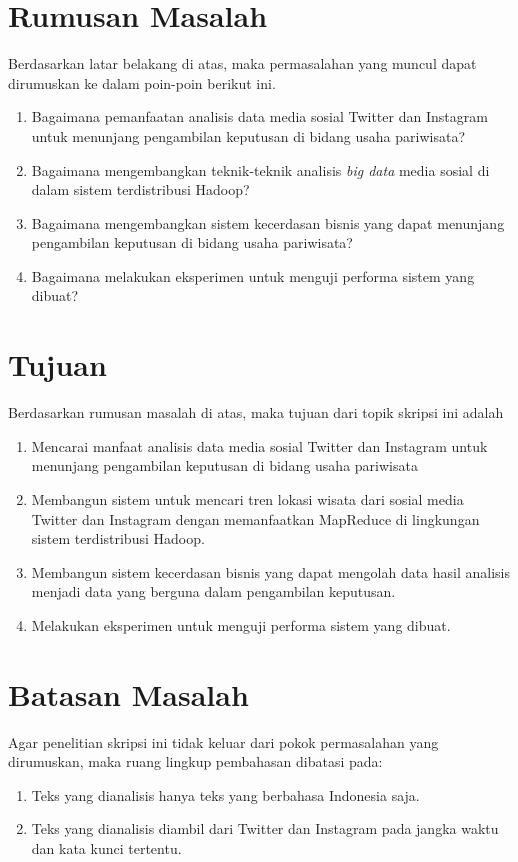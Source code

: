 \section{Rumusan Masalah}
\label{sec:rumusan_masalah}
Berdasarkan latar belakang di atas, maka permasalahan yang muncul dapat dirumuskan ke dalam poin-poin berikut ini.
\begin{enumerate}
	\item Bagaimana pemanfaatan analisis data media sosial Twitter dan Instagram untuk menunjang pengambilan keputusan di bidang usaha pariwisata?
	\item Bagaimana mengembangkan teknik-teknik analisis \textit{big data} media sosial di dalam sistem terdistribusi Hadoop?
	\item Bagaimana mengembangkan sistem kecerdasan bisnis yang dapat menunjang pengambilan keputusan di bidang usaha pariwisata?
	\item Bagaimana melakukan eksperimen untuk menguji performa sistem yang dibuat?
\end{enumerate}

\section{Tujuan}
\label{sec:tujuan}
Berdasarkan rumusan masalah di atas, maka tujuan dari topik skripsi ini adalah 
\begin{enumerate}
	\item Mencarai manfaat analisis data media sosial Twitter dan Instagram untuk menunjang pengambilan keputusan di bidang usaha pariwisata
	\item Membangun sistem untuk mencari tren lokasi wisata dari sosial media Twitter dan Instagram dengan memanfaatkan MapReduce di lingkungan sistem terdistribusi Hadoop.
	\item Membangun sistem kecerdasan bisnis yang dapat mengolah data hasil analisis menjadi data yang berguna dalam pengambilan keputusan.
	\item Melakukan eksperimen untuk menguji performa sistem yang dibuat.
\end{enumerate}

\section{Batasan Masalah}
\label{sec:batasan_masalah}
Agar penelitian skripsi ini tidak keluar dari pokok permasalahan yang dirumuskan, maka ruang lingkup pembahasan dibatasi pada:
\begin{enumerate}
	\item Teks yang dianalisis hanya teks yang berbahasa Indonesia saja. 
	\item Teks yang dianalisis diambil dari Twitter dan Instagram pada jangka waktu dan kata kunci tertentu.
\end{enumerate}

